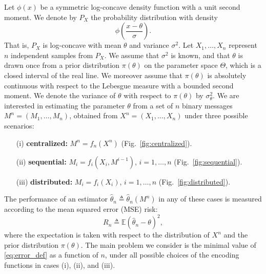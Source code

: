 \documentclass[letterpaper, conference]{IEEEtran}      %
\begin{document}
Let $\phi(x)$ be a symmetric log-concave density function with a unit second moment. We denote by $P_X$ the probability distribution with density
\[
\phi\left( \frac{x-\theta}{\sigma} \right).
\]
That is, $P_X$ is log-concave with mean $\theta$ and variance $\sigma^2$. Let $X_1,\ldots,X_n$ represent $n$ independent samples from $P_X$. We assume that $\sigma^2$ is known, and that $\theta$ is drawn once from a prior distribution $\pi(\theta)$ on the parameter space $\Theta$, which is a closed interval of the real line. We moreover assume that $\pi(\theta)$ is absolutely continuous with respect to the Lebesgue measure with a bounded second moment. We denote the variance of $\theta$ with respect to $\pi(\theta)$ by $\sigma_\theta^2$. We are interested in estimating the parameter $\theta$ from a set of $n$ binary messages $M^n = (M_1,\ldots,M_n)$, obtained from $X^n = (X_1,\ldots,X_n)$ under three possible scenarios: 
\begin{itemize}
\item[(i)] {\bf centralized:} $M^n = f_n(X^n)$ (Fig.~\ref{fig:centralized}).
\item[(ii)] {\bf sequential:} $M_i = f_i(X_i,M^{i-1})$, $i=1,\ldots,n$ (Fig.~\ref{fig:sequential}).
\item[(iii)] {\bf distributed:} $M_i = f_i(X_i)$, $i=1,\ldots,n$ (Fig.~\ref{fig:distributed}).
\end{itemize}

The performance of an estimator $\widehat{\theta}_n \triangleq \widehat{\theta}_n(M^n)$ in any of these cases is measured according to the mean squared error (MSE) risk:
\begin{equation}
\label{eq:error_def}
R_n \triangleq \mathbb E\left(\widehat{\theta}_n - \theta \right)^2,
\end{equation}
where the expectation is taken with respect to the distribution of $X^n$ and the prior distribution $\pi(\theta)$.  
%
The main problem we consider is the minimal value of \eqref{eq:error_def} as a function of $n$, under all possible choices of the encoding functions in cases (i), (ii), and (iii). 
\end{document}
